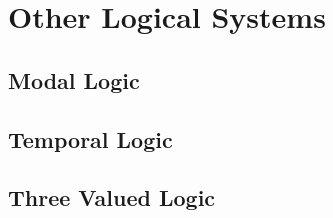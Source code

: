 










\section{Other Logical Systems}

\subsection{Modal Logic}

\subsection{Temporal Logic}



\subsection{Three Valued Logic}

